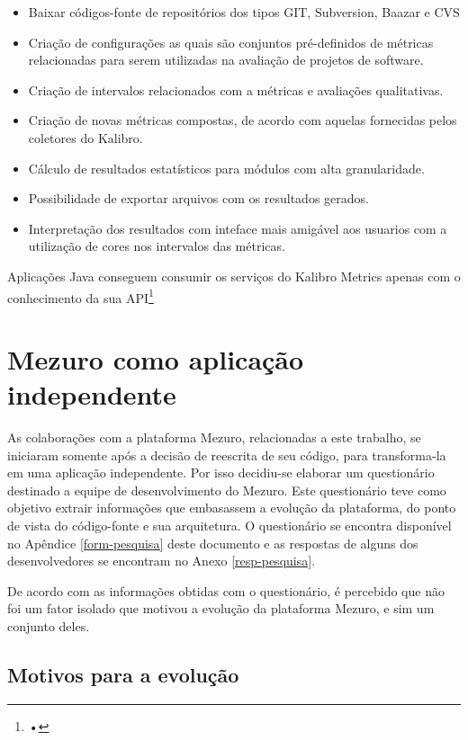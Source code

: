 \begin{itemize}
\item Baixar códigos-fonte de repositórios dos tipos GIT, Subversion, Baazar e CVS
\item Criação de configurações as quais são conjuntos pré-definidos de métricas relacionadas para serem utilizadas na avaliação de projetos de software.
\item Criação de intervalos relacionados com a métricas e avaliações qualitativas.
\item Criação de novas métricas compostas, de acordo com aquelas fornecidas pelos coletores do Kalibro.
\item Cálculo de resultados estatísticos para módulos com alta granularidade.
\item Possibilidade de exportar arquivos com os resultados gerados.
\item Interpretação dos resultados com inteface mais amigável aos usuarios com a utilização de cores nos intervalos das métricas.
\end{itemize}

Aplicações Java conseguem consumir os serviços do Kalibro Metrics apenas com o conhecimento da sua API\footnote{•}

\section{Mezuro como aplicação independente}

As colaborações com a plataforma Mezuro, relacionadas a este trabalho, se iniciaram somente após a decisão de reescrita de seu código, para transforma-la em uma aplicação independente. Por isso decidiu-se elaborar um questionário destinado a equipe de desenvolvimento do Mezuro. Este questionário teve como objetivo extrair informações que embasassem a evolução da plataforma, do ponto de vista do código-fonte e sua arquitetura. O questionário se encontra disponível no Apêndice \ref{form-pesquisa} deste documento e as respostas de alguns dos desenvolvedores se encontram no Anexo \ref{resp-pesquisa}.

De acordo com as informações obtidas com o questionário, é percebido que não foi um fator isolado que motivou a evolução da plataforma Mezuro, e sim um conjunto deles. 

\subsection{Motivos para a evolução}

